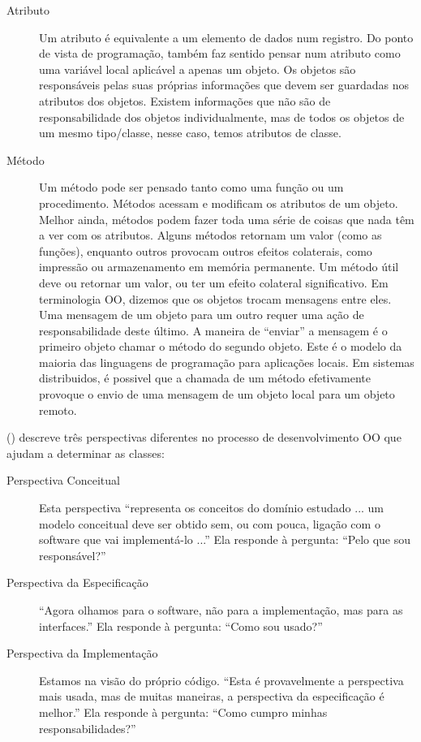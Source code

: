 \begin{description}
\item[Atributo] Um atributo é equivalente a um elemento de dados num registro. Do ponto de vista de programação, também faz sentido pensar num atributo como uma variável local aplicável a apenas um objeto. Os objetos são responsáveis pelas suas próprias informações que devem ser guardadas nos atributos dos objetos. Existem informações que não são de responsabilidade dos objetos individualmente, mas de todos os objetos de um mesmo tipo/classe, nesse caso, temos atributos de classe.

\item[Método] Um método pode ser pensado tanto como uma função ou um procedimento. Métodos acessam e modificam os atributos de um objeto. Melhor ainda, métodos podem fazer toda uma série de coisas que nada têm a ver com os atributos. Alguns métodos retornam um valor (como as funções), enquanto outros provocam outros efeitos colaterais, como impressão ou armazenamento em memória permanente. Um método útil deve ou retornar um valor, ou ter um efeito colateral significativo. Em terminologia OO, dizemos que os objetos trocam mensagens entre eles. Uma mensagem de um objeto para um outro requer uma ação de responsabilidade deste último. A maneira de ``enviar'' a mensagem é o primeiro objeto chamar o método do segundo objeto. Este é o modelo da maioria das linguagens de programação para aplicações locais. Em sistemas distribuidos, é possivel que a chamada de um método efetivamente provoque o envio de uma mensagem de um objeto local para um objeto remoto.

\end{description}

() descreve três perspectivas diferentes no processo de desenvolvimento OO que ajudam a determinar as classes:

\begin{description}
\item[Perspectiva Conceitual] Esta perspectiva ``representa os conceitos do domínio estudado ... um modelo conceitual deve ser obtido sem, ou com pouca, ligação com o software que vai implementá-lo ...'' Ela responde à pergunta: ``Pelo que sou responsável?''

\item[Perspectiva da Especificação] ``Agora olhamos para o software, não para a implementação, mas para as interfaces.'' Ela responde à pergunta: ``Como sou usado?''

\item[Perspectiva da Implementação] Estamos na visão do próprio código. ``Esta é provavelmente a perspectiva mais usada, mas de muitas maneiras, a perspectiva da especificação é melhor.'' Ela responde à pergunta: ``Como cumpro minhas responsabilidades?''
\end{description}

